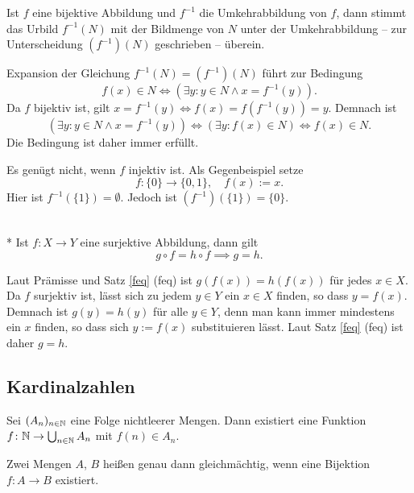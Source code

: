 \begin{Satz}
Ist $f$ eine bijektive Abbildung und $f^{-1}$ die Umkehrabbildung
von $f$, dann stimmt das Urbild $f^{-1}(N)$ mit der Bildmenge
von $N$ unter der Umkehrabbildung -- zur Unterscheidung $(f^{-1})(N)$
geschrieben -- überein.
\end{Satz}
\begin{Beweis}
Expansion der Gleichung $f^{-1}(N)=(f^{-1})(N)$ führt zur Bedingung
\[f(x)\in N\iff (\exists y\colon y\in N\land x=f^{-1}(y)).\]
Da $f$ bijektiv ist, gilt $x=f^{-1}(y)\iff f(x)=f(f^{-1}(y))=y$.
Demnach ist
\[(\exists y\colon y\in N\land x=f^{-1}(y))\iff (\exists y\colon f(x)\in N)\iff f(x)\in N.\]
Die Bedingung ist daher immer erfüllt.\;\qedsymbol
\end{Beweis}
Es genügt nicht, wenn $f$ injektiv ist. Als Gegenbeispiel setze
\[f\colon\{0\}\to\{0,1\},\quad f(x):=x.\]
Hier ist $f^{-1}(\{1\})=\emptyset$. Jedoch ist
$(f^{-1})(\{1\})=\{0\}$.

\begin{Satz}\mbox{}\\*
Ist $f\colon X\to Y$ eine surjektive Abbildung, dann gilt
\[g\circ f = h\circ f \implies g=h.\]
\end{Satz}
\begin{Beweis}
Laut Prämisse und Satz \ref{feq} (feq) ist $g(f(x)) = h(f(x))$
für jedes $x\in X$. Da $f$ surjektiv ist, lässt sich zu
jedem $y\in Y$ ein $x\in X$ finden, so dass $y=f(x)$. Demnach ist
$g(y)=h(y)$ für alle $y\in Y$, denn man kann immer mindestens
ein $x$ finden, so dass sich $y:=f(x)$ substituieren lässt.
Laut Satz \ref{feq} (feq) ist daher $g=h$.\;\qedsymbol
\end{Beweis}

\newpage
\subsection{Kardinalzahlen}

\begin{Axiom}\label{acc}%
Sei $(A_n)_{n\in\mathbb N}$ eine Folge nichtleerer Mengen.
Dann existiert eine Funktion $f\colon\mathbb N\to\bigcup_{n\in\mathbb N} A_n$
mit $f(n)\in A_n$.
\end{Axiom}

\begin{Definition}%
\label{def:equipotent}
Zwei Mengen $A$, $B$ heißen genau dann gleichmächtig, wenn
eine Bijektion $f\colon A\to B$ existiert.
\end{Definition}

